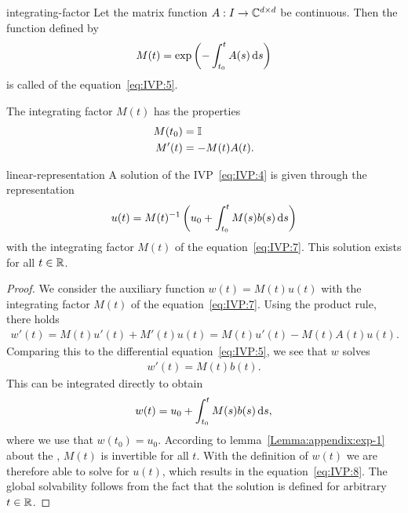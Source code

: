 \begin{Definition}{integrating-factor}
    Let the matrix function $A:I\to \mathbb C^{d\times d}$ be continuous.  Then
  the function defined by
  \begin{gather}
    \label{eq:IVP:7}
    M(t) = \exp\left(-\int_{t_0}^t A(s) \,\mathrm{d} s\right)
  \end{gather}
  is called  of the
  equation~\eqref{eq:IVP:5}.
\end{Definition}

\begin{corollary}
  The integrating factor $M(t)$ has the properties
  \begin{align}
    \label{eq:IVP:14}
    M(t_0) &= \mathbb I\\
    \label{eq:IVP:15}
    M'(t) &= -M(t)A(t).
  \end{align}
\end{corollary}

\begin{Lemma}{linear-representation}
  A solution of the IVP~\eqref{eq:IVP:4} is given through the 
  representation
  \begin{gather}
    \label{eq:IVP:8}
    u(t) =  M(t)^{-1}\left(u_0 + \int_{t_0}^t M(s) b(s) \,\mathrm{d} s\right)
  \end{gather}
  with the integrating factor $M(t)$ of the equation~\eqref{eq:IVP:7}.
  This solution exists for all $t\in \mathbb R$.
\end{Lemma}

\begin{proof}
  We consider the auxiliary function $w(t) = M(t) u(t)$ with the
  integrating factor $M(t)$ of the equation~\eqref{eq:IVP:7}. Using the
  product rule, there holds
  \begin{gather}
    \label{eq:IVP:19}
    w'(t) =  M(t) u'(t) + M'(t) u(t)
    =  M(t) u'(t) - M(t)A(t)u(t).
  \end{gather}
  Comparing this to the differential equation~\eqref{eq:IVP:5}, we see
  that $w$ solves
  \begin{gather*}
    w'(t) = M(t) b(t).
  \end{gather*}
	This can be integrated directly to obtain	
  \begin{gather*}
    w(t) = u_0 + \int_{t_0}^t M(s) b(s) \,\mathrm{d} s,
  \end{gather*}
  where we use that $w(t_0) = u_0$.  According to
  lemma~\ref{Lemma:appendix:exp-1} about the , $M(t)$ is invertible for all $t$.  With the
  definition of $w(t)$ we are therefore able to solve for $u(t)$,
  which results in the equation~\eqref{eq:IVP:8}. The global
  solvability follows from the fact that the solution is defined for
  arbitrary $t\in \mathbb R$.
\end{proof}

